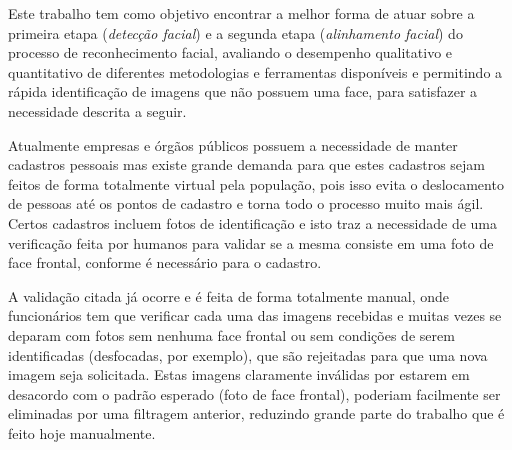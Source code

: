 Este trabalho tem como objetivo encontrar a melhor forma de atuar sobre a primeira etapa (\textit{detecção facial}) e a segunda etapa (\textit{alinhamento facial}) do processo de reconhecimento facial, avaliando o desempenho qualitativo e quantitativo de diferentes metodologias e ferramentas disponíveis e permitindo a rápida identificação de imagens que não possuem uma face, para satisfazer a necessidade descrita a seguir.

Atualmente empresas e órgãos públicos possuem a necessidade de manter cadastros pessoais mas existe grande demanda para que estes cadastros sejam feitos de forma totalmente virtual pela população, pois isso evita o deslocamento de pessoas até os pontos de cadastro e torna todo o processo muito mais ágil. Certos cadastros incluem fotos de identificação e isto traz a necessidade de uma verificação feita por humanos para validar se a mesma consiste em uma foto de face frontal, conforme é necessário para o cadastro.

A validação citada já ocorre e é feita de forma totalmente manual, onde funcionários tem que verificar cada uma das imagens recebidas e muitas vezes se deparam com fotos sem nenhuma face frontal ou sem condições de serem identificadas (desfocadas, por exemplo), que são rejeitadas para que uma nova imagem seja solicitada. Estas imagens claramente inválidas por estarem em desacordo com o padrão esperado (foto de face frontal), poderiam facilmente ser eliminadas por uma filtragem anterior, reduzindo grande parte do trabalho que é feito hoje manualmente.